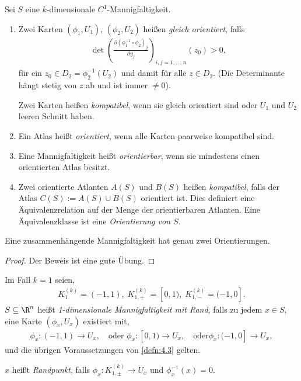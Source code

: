 \addtocounter{prop}{1}

\begin{defn}
\label{defn:4.9}
Sei $S$ eine $k$-dimensionale $C^1$-Mannigfaltigkeit.
\begin{enumerate}[label=\arabic{*}.)]
\item Zwei Karten $(\phi_1,U_1)$, $(\phi_2,U_2)$ heißen \emph{gleich
orientiert}, falls
\begin{align*}
\det \left(\frac{\partial (\phi_1^{-1}\circ\phi_2)_j}{\partial y_j}\right)_{i,j
= 1,\ldots,n} (z_0) > 0,
\end{align*}
für ein $z_0\in D_2=\phi_2^{-1}(U_2)$ und damit für alle $z\in D_2$. (Die
Determinante hängt stetig von $z$ ab und ist immer $\neq 0$).

Zwei Karten heißen \emph{kompatibel}, wenn sie gleich orientiert sind oder
$U_1$ und $U_2$ leeren Schnitt haben.
\item Ein Atlas heißt \emph{orientiert}, wenn alle Karten paarweise kompatibel
sind.
\item Eine Mannigfaltigkeit heißt \emph{orientierbar}, wenn sie mindestens einen
orientierten Atlas besitzt.
\item Zwei orientierte Atlanten $A(S)$ und $B(S)$ heißen \emph{kompatibel},
falls der Atlas $C(S) := A(S)\cup B(S)$ orientiert ist. Dies definiert eine
Äquivalenzrelation auf der Menge der orientierbaren Atlanten. Eine
Äquivalenzklasse ist eine \emph{Orientierung von $S$}.\fishhere
\end{enumerate}
\end{defn}

\begin{lemn}
Eine zusammenhängende Mannigfaltigkeit hat genau zwei Orientierungen.\fishhere
\end{lemn}
\begin{proof}
Der Beweis ist eine gute Übung.\qedhere
\end{proof}

\begin{defn}
Im Fall $k=1$ seien,
\begin{align*}
K_1^{(k)} = (-1,1),\; K_{1,+}^{(k)} = [0,1),\; K_{1,-}^{(k)} = (-1,0]. 
\end{align*}
$S\subseteq \R^n$ heißt \emph{1-dimensionale
Mannigfaltigkeit mit Rand}, falls zu jedem $x\in S$, eine Karte $(\phi_x,U_x)$
existiert mit,
\begin{align*}
\phi_x : (-1,1)\to U_x,\quad\text{oder }\phi_x: [0,1) \to U_x,\quad\text{oder
}\phi_x: (-1,0]\to U_x,
\end{align*}
und die übrigen Voraussetzungen von \ref{defn:4.3} gelten.

$x$ heißt \emph{Randpunkt}, falls $\phi_x : K_{1,\pm}^{(k)}\to U_x$ und
$\phi_x^{-1}(x) = 0$.\fishhere
\end{defn}

